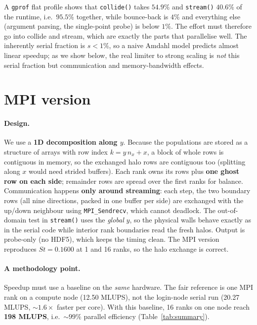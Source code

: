 \documentclass[10pt,twocolumn,a4paper]{article}
\begin{document}
A \texttt{gprof} flat profile shows that \texttt{collide()} takes
$54.9\%$ and \texttt{stream()} $40.6\%$ of the runtime, i.e.\ $95.5\%$
together, while bounce-back is $4\%$ and everything else (argument
parsing, the single-point probe) is below $1\%$. The
effort must therefore go into collide and stream, which are exactly the
parts that parallelise well. The inherently serial fraction is
$s<1\%$, so a naive Amdahl model predicts almost linear speedup; as we
show below, the real limiter to strong scaling is \emph{not} this serial
fraction but communication and memory-bandwidth effects.

\section{MPI version}
\paragraph{Design.} We use a \textbf{1D decomposition along $y$}. Because
the populations are stored as a structure of arrays with row index
$k=y\,n_x+x$, a block of whole rows is contiguous in memory, so the
exchanged halo rows are contiguous too (splitting along $x$ would need
strided buffers). Each rank owns its rows plus \textbf{one ghost row on
each side}; remainder rows are spread over the first ranks for balance.
Communication happens \textbf{only around streaming}: each step, the two
boundary rows (all nine directions, packed in one buffer per side) are
exchanged with the up/down neighbour using \texttt{MPI\_Sendrecv}, which
cannot deadlock. The out-of-domain test in \texttt{stream()} uses the
\emph{global} $y$, so the physical walls behave exactly as in the serial
code while interior rank boundaries read the fresh halos. Output is
probe-only (no HDF5), which keeps the timing clean. The MPI version
reproduces $St=0.1600$ at 1 and 16 ranks, so the halo exchange is
correct.

\paragraph{A methodology point.} Speedup must use a baseline on the
\emph{same} hardware. The fair reference is one MPI rank on a compute
node (12.50 MLUPS), not the login-node serial run (20.27 MLUPS,
$\sim1.6\times$ faster per core). With this baseline, 16 ranks on one node
reach \textbf{198 MLUPS}, i.e.\ $\sim99\%$
parallel efficiency (Table~\ref{tab:summary}).
\end{document}
